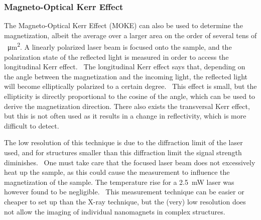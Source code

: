\documentclass[10pt,a4paper]{article}
\begin{document}
\subsubsection{Magneto-Optical Kerr Effect}
The Magneto-Optical Kerr Effect (MOKE) can also be used to determine the magnetization, albeit the average over a larger area on the order of several tens of \SI{}{\micro\metre\squared}. A linearly polarized laser beam is focused onto the sample, and the polarization state of the reflected light is measured in order to access the longitudinal Kerr effect.~\cite{MQCA_RoomTemp} The longitudinal Kerr effect says that, depending on the angle between the magnetization and the incoming light, the reflected light will become elliptically polarized to a certain degree.~\cite{KerrFaraday_book} This effect is small, but the ellipticity is directly proportional to the cosine of the angle, which can be used to derive the magnetization direction. There also exists the transversal Kerr effect, but this is not often used as it results in a change in reflectivity, which is more difficult to detect. \par 
The low resolution of this technique is due to the diffraction limit of the laser used, and for structures smaller than this diffraction limit the signal strength diminishes.~\cite{Probing_MagnetoOptics} One must take care that the focused laser beam does not excessively heat up the sample, as this could cause the measurement to influence the magnetization of the sample. The temperature rise for a \SI{2.5}{\milli\watt} laser was however found to be negligible.~\cite{Probing_MagnetoOptics} This measurement technique can be easier or cheaper to set up than the X-ray technique, but the (very) low resolution does not allow the imaging of individual nanomagnets in complex structures.

\end{document}
